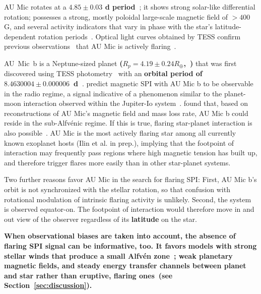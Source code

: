 \documentclass[fleqn,usenatbib]{mnras}%
\begin{document}
AU Mic rotates at a \textbf{$4.85\pm0.03$ d period~\citep{gilbert2021flares}}; it shows strong solar-like differential rotation; possesses a strong, mostly poloidal large-scale magnetic field of $>400$ G, and several activity indicators that vary in phase with the star's latitude-dependent rotation periods~\citep{klein2021}. Optical light curves obtained by TESS confirm previous observations~\citep{katsova1999, robinson2001, redfield2002} that AU Mic is actively flaring~\citep{martioli2021new}.

\mbox{AU Mic b} is a Neptune-sized planet \textbf{(\mbox{$R_p = 4.19\pm0.24R_\oplus$},~\citealt{gilbert2021flares})} that was first discovered using TESS photometry~\citep{plavchan2020} with an \textbf{orbital period of \mbox{$8.4630004\pm0.000006$ d}~\citep{gilbert2021flares}}. 
\citet{kavanagh2021} predict magnetic SPI with AU Mic b to be observable in the radio regime, a signal indicative of a phenomenon similar to the planet-moon interaction observed within the Jupiter-Io system~\citep{saur2013magnetic}. \citet{kavanagh2021} found that, based on reconstructions of AU Mic's magnetic field and mass loss rate, AU Mic b could reside in the sub-Alfv\'enic regime. If this is true, flaring star-planet interaction is also possible~\citep{lanza2018close-by}. AU Mic is the most actively flaring star among all currently known exoplanet hosts (Ilin et al. in prep.), implying that the footpoint of interaction may frequently pass regions where high magnetic tension has built up, and therefore trigger flares more easily than in other star-planet systems. 

Two further reasons favor AU Mic in the search for flaring SPI: First, AU Mic b's orbit is not synchronized with the stellar rotation, so that confusion with rotational modulation of intrinsic flaring activity is unlikely. Second, the system is observed equator-on. The footpoint of interaction would therefore move in and out view of the observer regardless of its \textbf{latitude} on the star.

\textbf{When observational biases are taken into account, the absence of flaring SPI signal can be informative, too. It favors models with strong stellar winds that produce a small Alfv\'en zone~\citep{kavanagh2021}; weak planetary magnetic fields, and steady energy transfer channels between planet and star rather than eruptive, flaring ones~(see Section~\ref{sec:discussion}).}  
\end{document}
